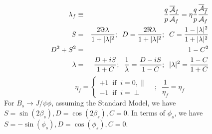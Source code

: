 \documentclass[a4paper,9pt,twoside]{article}
\begin{document}
\begin{eqnarray}
   \lambda_f &\equiv& \frac{q}{p}\frac{\overline{\cal A}_f}{{\cal A}_f} = \eta\frac{q}{p} \frac{\overline{\cal A}_{\overline{f}}}{{\cal A}_f}\\
   S &=& \frac{2 \Im \lambda}{1+|\lambda|^2};\;\; D = \frac{2 \Re \lambda}{1+|\lambda|^2};\;\; C = \frac{1-|\lambda|^2 }{1+|\lambda|^2}\\
   D^2+S^2 & = & 1 - C^2 \\
   \lambda & = & \frac{D+iS}{1+C};\;\; \frac{1}{\lambda}  =  \frac{D-iS}{1-C};\;\; |\lambda|^2 = \frac{ 1-C }{ 1+C }
\end{eqnarray}
\begin{equation}
  \eta_f = \left\{ \begin{array}{l} +1 \;\; \mathrm{if}\;\; i=0,\parallel  \\ -1\;\; \mathrm{if}\;\; i=\perp \end{array} \right. \;\;\;;\;\; \frac{1}{\eta_f}=\eta_f
  \label{eq:etadef}
\end{equation}
For $B_s\rightarrow J/\psi\phi$, assuming the Standard Model,  we have $S=\sin(2\beta_s),D=\cos(2\beta_s),C=0$.
In terms of $\phi_s$, we have $S=-\sin(\phi_s),D=\cos(\phi_s),C=0$.
\end{document}
